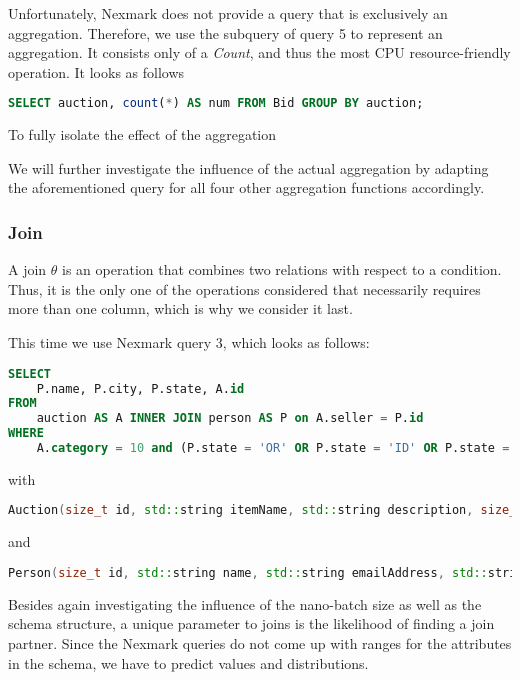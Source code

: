 Unfortunately, Nexmark does not provide a query that is exclusively an aggregation.
Therefore, we use the subquery of query 5 to represent an aggregation.
It consists only of a \emph{Count}, and thus the most CPU resource-friendly operation.
It looks as follows
\begin{lstlisting}[language=SQL]
SELECT auction, count(*) AS num FROM Bid GROUP BY auction;
\end{lstlisting}

To fully isolate the effect of the aggregation

We will further investigate the influence of the actual aggregation by adapting the aforementioned query for all four other aggregation functions accordingly. 

\subsubsection{Join}

A join $\theta$ is an operation that combines two relations with respect to a condition.
Thus, it is the only one of the operations considered that necessarily requires more than one column, which is why we consider it last.

This time we use Nexmark query 3, which looks as follows:
\begin{lstlisting}[language=SQL]
SELECT
    P.name, P.city, P.state, A.id
FROM
    auction AS A INNER JOIN person AS P on A.seller = P.id
WHERE
    A.category = 10 and (P.state = 'OR' OR P.state = 'ID' OR P.state = 'CA');
\end{lstlisting}
with
\begin{lstlisting}[language=c++]
Auction(size_t id, std::string itemName, std::string description, size_t initialId, size_t reserve, time_t dateTime, time_t expires, size_t seller, size_t category, std::string extra);
\end{lstlisting}
and

\begin{lstlisting}[language=c++]
Person(size_t id, std::string name, std::string emailAddress, std::string creditCard, std::string city, std::string state, time_t dateTime, std::string extra);
\end{lstlisting}

Besides again investigating the influence of the nano-batch size as well as the schema structure, a unique parameter to joins is the likelihood of finding a join partner.
Since the Nexmark queries do not come up with ranges for the attributes in the schema, we have to predict values and distributions.

